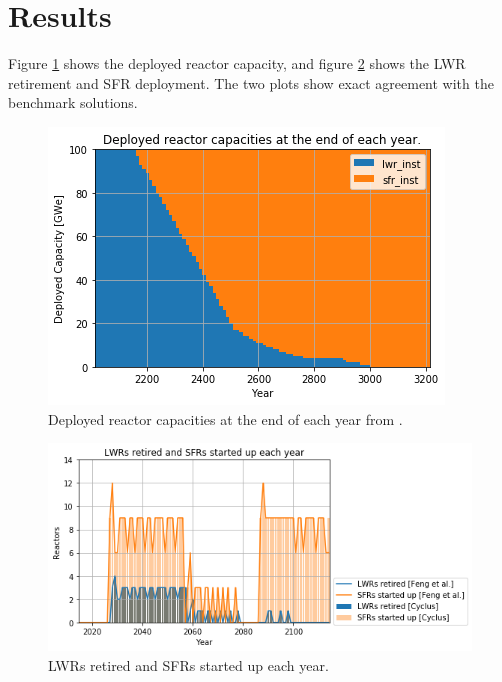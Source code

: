 \section{Results}
Figure \ref{fig:pow_plot} shows the deployed reactor capacity, and
figure \ref{fig:dep} shows the \gls{LWR} retirement and \gls{SFR}
deployment. The two plots show exact agreement with the
benchmark solutions.

\begin{figure}[htbp!]
	\begin{center}
		\includegraphics[scale=0.7]{./images/results_18/power_plot.png}
	\end{center}
	\caption{Deployed reactor capacities at the end of each year from \Cyclus.}
	\label{fig:pow_plot}
\end{figure}


\begin{figure}[htbp!]
	\begin{center}
		\includegraphics[scale=0.7]{./images/results_18/dep.png}
	\end{center}
	\caption{\glspl{LWR} retired and \glspl{SFR} started up each year.}
	\label{fig:dep}
\end{figure}

